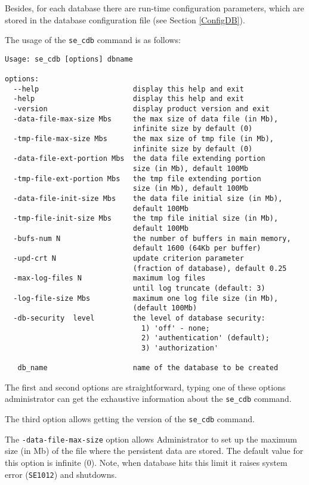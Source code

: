 \documentclass[a4paper,12pt]{article}
\begin{document}
Besides, for each database there are run-time configuration parameters, which
are stored in the database configuration file (see Section \ref{ConfigDB}).

The usage of the \verb!se_cdb! command is as follows:

\small{
\begin{verbatim}
Usage: se_cdb [options] dbname

options:
  --help                      display this help and exit
  -help                       display this help and exit
  -version                    display product version and exit
  -data-file-max-size Mbs     the max size of data file (in Mb),
                              infinite size by default (0)
  -tmp-file-max-size Mbs      the max size of tmp file (in Mb),
                              infinite size by default (0)
  -data-file-ext-portion Mbs  the data file extending portion
                              size (in Mb), default 100Mb
  -tmp-file-ext-portion Mbs   the tmp file extending portion
                              size (in Mb), default 100Mb
  -data-file-init-size Mbs    the data file initial size (in Mb),
                              default 100Mb
  -tmp-file-init-size Mbs     the tmp file initial size (in Mb),
                              default 100Mb
  -bufs-num N                 the number of buffers in main memory,
                              default 1600 (64Kb per buffer)
  -upd-crt N                  update criterion parameter
                              (fraction of database), default 0.25
  -max-log-files N            maximum log files
                              until log truncate (default: 3)
  -log-file-size Mbs          maximum one log file size (in Mb),
                              (default 100Mb)
  -db-security  level         the level of database security:
                                1) 'off' - none;
                                2) 'authentication' (default);
                                3) 'authorization'

   db_name                    name of the database to be created
\end{verbatim}}

The first and second options are straightforward, typing one of these options
administrator can get the exhaustive information about the \verb!se_cdb!
command.

The third option allows getting the version of the \verb!se_cdb! command.

The \verb!-data-file-max-size! option allows Administrator to set up the maximum
size (in Mb) of the file where the persistent data are stored. The default value
for this option is infinite (0). Note, when database hits this limit it raises
system error (\verb!SE1012!) and shutdowns.
\end{document}
